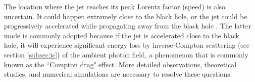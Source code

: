 The location where the jet reaches its peak Lorentz factor (speed) is also uncertain. It could happen extremely close to the black hole, or the jet could be progressively accelerated while propagating away from the black hole  \citep[see~][]{meier2003theory}. The latter mode is commonly adopted because if the jet is accelerated close to the black hole, it will experience significant energy loss by inverse-Compton scattering (see section \ref{subsec:ic}) of the ambient photon field, a phenomenon that is commonly known as the ``Compton drag" effect.
More detailed observations, theoretical studies, and numerical simulations are necessary to resolve these questions.












